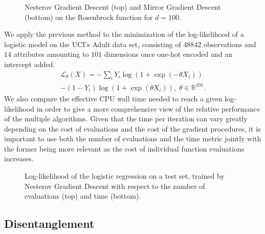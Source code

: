 \begin{figure}
    \centering
    \begin{subfigure}[t]{1.\linewidth}
        \centering
        
    \end{subfigure}%
    \hfill
    \begin{subfigure}[t]{1.\linewidth}
        \centering
        
    \end{subfigure}%
    \caption{Nesterov Gradient Descent (top) and Mirror Gradient Descent (bottom) on the Rosenbrock function for $d=100$.}\label{fig:rosenbrock_vs}
\end{figure}
We apply the previous method to the minimization of the log-likelihood of a logistic model on the UCI's Adult data set, consisting of $48842$ observations and $14$ attributes amounting to $101$ dimensions once one-hot encoded and an intercept added.
\begin{multline}
    \mathcal{L}_\theta (X) =  -\sum_i Y_i \log (1 + \exp (-\theta X_i)) \\
    -(1 - Y_i) \log (1 + \exp (\theta X_i)), \; \theta \in \mathbb{R}^{101}.
\end{multline}
We also compare the effective CPU wall time needed to reach a given log-likelihood in order to give a more comprehensive view of the relative performance of the multiple algorithms. Given that the time per iteration can vary greatly depending on the cost of evaluations and the cost of the gradient procedures, it is important to use both the number of evaluations and the time metric jointly with the former being more relevant as the cost of individual function evaluations increases.
\begin{figure}
    \centering
    \begin{subfigure}[b]{1.\linewidth}
        \centering
    \end{subfigure}%
    \vfill
    \begin{subfigure}[b]{1.\linewidth}
        \centering
    \end{subfigure}%
    \caption{Log-likelihood of the logistic regression on a test set, trained by Nesterov Gradient Descent with respect to the number of evaluations (top) and time (bottom).}
\end{figure}

\subsection{Disentanglement}

